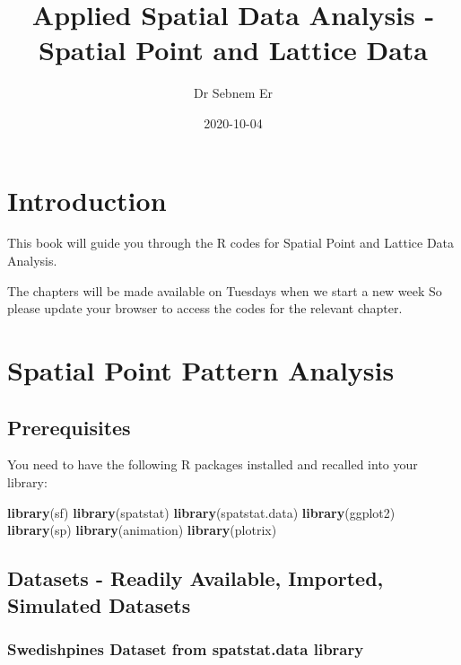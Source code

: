 \documentclass[
]{book}
\title{Applied Spatial Data Analysis - Spatial Point and Lattice Data}
\author{Dr Sebnem Er}
\date{2020-10-04}
\newenvironment{Shaded}{\begin{snugshade}}{\end{snugshade}}
\newcommand{\KeywordTok}[1]{\textcolor[rgb]{0.13,0.29,0.53}{\textbf{#1}}}
\newcommand{\NormalTok}[1]{#1}
\begin{document}
\maketitle

{
\setcounter{tocdepth}{1}
\tableofcontents
}
\hypertarget{introduction}{%
\chapter{Introduction}\label{introduction}}

This book will guide you through the R codes for Spatial Point and Lattice Data Analysis.

The chapters will be made available on Tuesdays when we start a new week So please update your browser to access the codes for the relevant chapter.

\hypertarget{spatial-point-pattern-analysis}{%
\chapter{Spatial Point Pattern Analysis}\label{spatial-point-pattern-analysis}}

\hypertarget{prerequisites}{%
\section{Prerequisites}\label{prerequisites}}

You need to have the following R packages installed and recalled into your library:

\begin{Shaded}
\begin{Highlighting}[]
\KeywordTok{library}\NormalTok{(sf)}
\KeywordTok{library}\NormalTok{(spatstat)}
\KeywordTok{library}\NormalTok{(spatstat.data)}
\KeywordTok{library}\NormalTok{(ggplot2)}
\KeywordTok{library}\NormalTok{(sp)}
\KeywordTok{library}\NormalTok{(animation)}
\KeywordTok{library}\NormalTok{(plotrix)}
\end{Highlighting}
\end{Shaded}

\hypertarget{datasets---readily-available-imported-simulated-datasets}{%
\section{Datasets - Readily Available, Imported, Simulated Datasets}\label{datasets---readily-available-imported-simulated-datasets}}

\hypertarget{swedishpines-dataset-from-spatstat.data-library}{%
\subsection{Swedishpines Dataset from spatstat.data library}\label{swedishpines-dataset-from-spatstat.data-library}}
\end{document}
